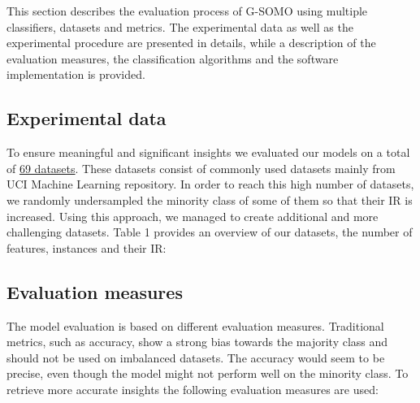\documentclass[parskip=full]{scrartcl}
\begin{document}
This section describes the evaluation process of G-SOMO using multiple classifiers, datasets and metrics. The experimental data as well as the experimental procedure are presented in details, while a description of the evaluation measures, the classification algorithms and the software implementation is provided.

\subsection{Experimental data}

To ensure meaningful and significant insights we evaluated our models on a total of \href{https://github.com/AlgoWit/publications/blob/master/gsomo/data/gsomo.db}{69 datasets}. These datasets consist of commonly used datasets mainly from UCI Machine Learning repository. In order to reach this high number of datasets, we randomly undersampled the minority class of some of them so that their IR is increased. Using this approach, we managed to create additional and more challenging datasets. Table 1 provides an overview of our datasets, the number of features, instances and their IR:


\subsection{Evaluation measures}

The model evaluation is based on different evaluation measures. Traditional metrics, such as accuracy, show a strong bias towards the majority class and should not be used on imbalanced datasets. The accuracy would seem to be precise, even though the model might not perform well on the minority class. To retrieve more accurate insights the following evaluation measures are used:
\end{document}
